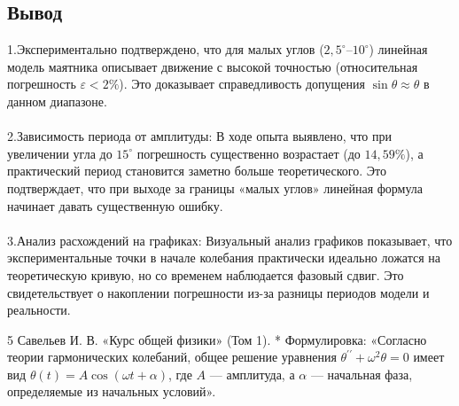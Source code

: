 \subsection{Вывод}
1.Экспериментально подтверждено, что для малых углов ($2{,}5^\circ$–$10^\circ$) линейная модель маятника описывает движение с высокой точностью (относительная погрешность $\varepsilon < 2\%$). Это доказывает справедливость допущения $\sin \theta \approx \theta$ в данном диапазоне.
\\ \\2.Зависимость периода от амплитуды: В ходе опыта выявлено, что при увеличении угла до $15^\circ$ погрешность существенно возрастает (до $14{,}59\%$), а практический период становится заметно больше теоретического. Это подтверждает, что при выходе за границы «малых углов» линейная формула начинает давать существенную ошибку.
\\ \\3.Анализ расхождений на графиках: Визуальный анализ графиков показывает, что экспериментальные точки в начале колебания практически идеально ложатся на теоретическую кривую, но со временем наблюдается фазовый сдвиг. Это свидетельствует о накоплении погрешности из-за разницы периодов модели и реальности.


\begin{thebibliography}{5}
Савельев И. В. «Курс общей физики» (Том 1).
 * Формулировка: «Согласно теории гармонических колебаний, общее решение уравнения $\theta^{\prime\prime} + \omega^2 \theta = 0$ имеет вид $\theta(t) = A \cos(\omega t + \alpha)$, где $A$ — амплитуда, а $\alpha$ — начальная фаза, определяемые из начальных условий».
\end{thebibliography}
